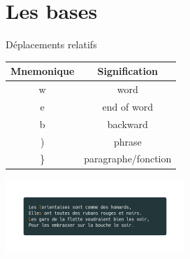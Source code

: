 \documentclass[10pt]{beamer}
\begin{document}
\section{Les bases}
	\begin{frame}{Déplacements relatifs}
		\center
		\begin{tabular}{|c|c|}
			\hline
			\textbf{Mnemonique} & \textbf{Signification} \\ 
			\hline
			\hline
			w & word \\ 
			\hline
			e & end of word \\ 
			\hline
			b & backward \\ 
			\hline
			) & phrase \\ 
			\hline
			\} & paragraphe/fonction \\ 
			\hline
		\end{tabular}
		\includegraphics[width=256]{img/moves.png}
	\end{frame}
\end{document}
